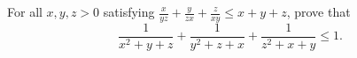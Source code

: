 For all $x,y,z>0$ satisfying  $\frac{x}{yz}+\frac{y}{zx}+\frac{z}{xy}\le x+y+z$,  prove that$$\frac{1}{x^2+y+z}+\frac{1}{y^2+z+x}+\frac{1}{z^2+x+y} \le 1.$$
